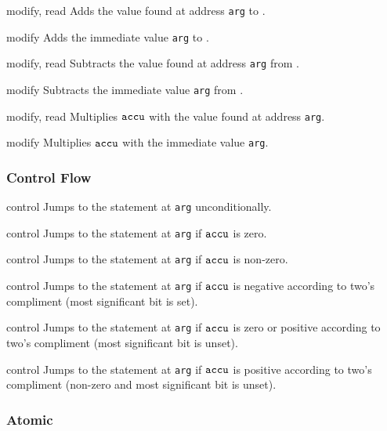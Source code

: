 {}
{modify, read}
{Adds the value found at address \texttt{arg} to \ACCU.}

{}
{modify}
{Adds the immediate value \texttt{arg} to \ACCU.}

{}
{modify, read}
{Subtracts the value found at address \texttt{arg} from \ACCU.}

{}
{modify}
{Subtracts the immediate value \texttt{arg} from \ACCU.}

{}
{modify, read}
{Multiplies $\texttt{accu}$ with the value found at address \texttt{arg}.}

{}
{modify}
{Multiplies $\texttt{accu}$ with the immediate value \texttt{arg}.}


\subsubsection*{Control Flow}


{}
{control}
{Jumps to the statement at \texttt{arg} unconditionally.}

{}
{control}
{Jumps to the statement at \texttt{arg} if $\texttt{accu}$ is zero.}

{}
{control}
{Jumps to the statement at \texttt{arg} if $\texttt{accu}$ is non-zero.}

{}
{control}
{Jumps to the statement at \texttt{arg} if $\texttt{accu}$ is negative according to two's compliment (most significant bit is set).}

{}
{control}
{Jumps to the statement at \texttt{arg} if $\texttt{accu}$ is zero or positive according to two's compliment (most significant bit is unset).}

{}
{control}
{Jumps to the statement at \texttt{arg} if $\texttt{accu}$ is positive according to two's compliment (non-zero and most significant bit is unset).}

\subsubsection*{Atomic}

